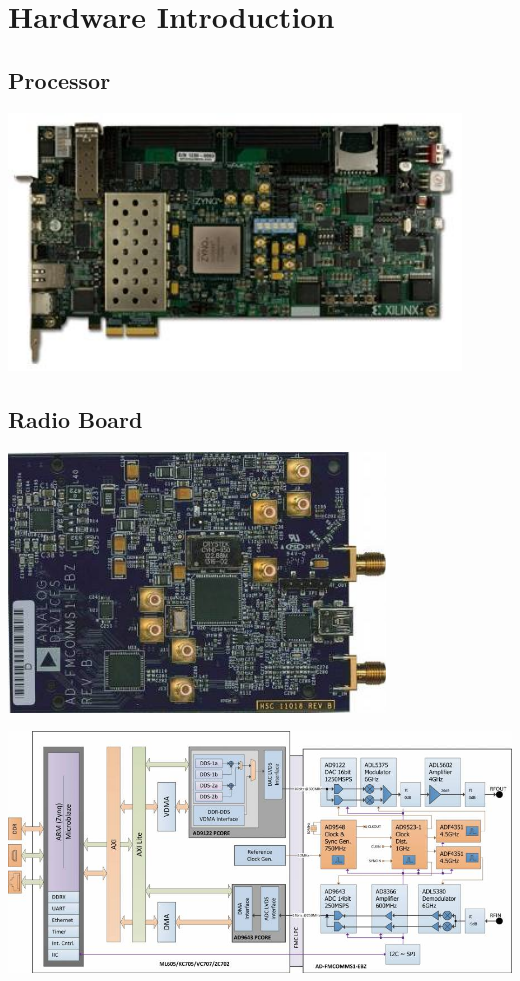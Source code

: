 \section{Hardware Introduction}
\subsection{Processor}
\begin{center}
\includegraphics[width=12cm]{content/fig/ZC706.JPG}
\end{center}

\subsection{Radio Board}
\begin{center}
\includegraphics[width=10cm]{content/fig/fmcomms1.jpg}
\end{center}

\begin{center}
\includegraphics[width=15cm]{content/fig/fmcomms1Blockdiagram.jpg}
\end{center}

